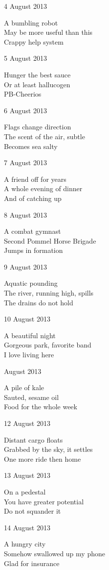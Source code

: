 \documentclass[12pt]{article}
\begin{document}
\newpage

4 August 2013

A bumbling robot \\
May be more useful than this \\
Crappy help system

5 August 2013

Hunger the best sauce \\
Or at least hallucogen \\
PB-Cheerios

6 August 2013

Flags change direction \\
The scent of the air, subtle \\
Becomes sea salty

7 August 2013

A friend off for years \\
A whole evening of dinner \\
And of catching up

8 August 2013

A combat gymnast \\
Second Pommel Horse Brigade \\
Jumps in formation

9 August 2013

Aquatic pounding \\
The river, running high, spills \\
The drains do not hold

10 August 2013

A beautiful night \\
Gorgeous park, favorite band \\
I love living here

 August 2013

A pile of kale \\
Sauted, sesame oil \\
Food for the whole week

12 August 2013

Distant cargo floats \\
Grabbed by the sky, it settles \\
One more ride then home

13 August 2013

On a pedestal \\
You have greater potential \\
Do not squander it

14 August 2013

A hungry city \\
Somehow swallowed up my phone \\
Glad for insurance
\end{document}
